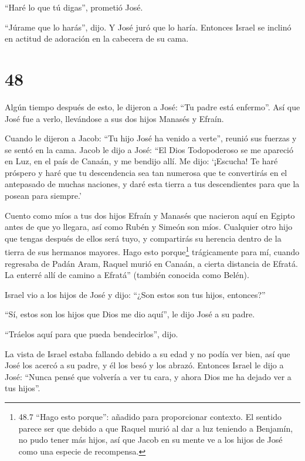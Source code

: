 ``Haré lo que tú digas'', prometió José.

 ``Júrame que lo harás'', dijo. Y José juró que lo haría.
Entonces Israel se inclinó en actitud de adoración en la cabecera de su
cama.

\hypertarget{section-47}{%
\section{48}\label{section-47}}

 Algún tiempo después de esto, le dijeron a José: ``Tu padre
está enfermo''. Así que José fue a verlo, llevándose a sus dos hijos
Manasés y Efraín.

 Cuando le dijeron a Jacob: ``Tu hijo José ha venido a
verte'', reunió sus fuerzas y se sentó en la cama.  Jacob le
dijo a José: ``El Dios Todopoderoso se me apareció en Luz, en el país de
Canaán, y me bendijo allí.  Me dijo: `¡Escucha! Te haré
próspero y haré que tu descendencia sea tan numerosa que te convertirás
en el antepasado de muchas naciones, y daré esta tierra a tus
descendientes para que la posean para siempre.'

 Cuento como míos a tus dos hijos Efraín y Manasés que
nacieron aquí en Egipto antes de que yo llegara, así como Rubén y Simeón
son míos.  Cualquier otro hijo que tengas después de ellos
será tuyo, y compartirás su herencia dentro de la tierra de sus hermanos
mayores.  Hago esto porque\footnote{48.7 ``Hago esto
  porque'': añadido para proporcionar contexto. El sentido parece ser
  que debido a que Raquel murió al dar a luz teniendo a Benjamín, no
  pudo tener más hijos, así que Jacob en su mente ve a los hijos de José
  como una especie de recompensa.} trágicamente para mí, cuando
regresaba de Padán Aram, Raquel murió en Canaán, a cierta distancia de
Efratá. La enterré allí de camino a Efratá'' (también conocida como
Belén).

 Israel vio a los hijos de José y dijo: ``¿Son estos son tus
hijos, entonces?''

 ``Sí, estos son los hijos que Dios me dio aquí'', le dijo
José a su padre.

``Tráelos aquí para que pueda bendecirlos'', dijo.

 La vista de Israel estaba fallando debido a su edad y no
podía ver bien, así que José los acercó a su padre, y él los besó y los
abrazó.  Entonces Israel le dijo a José: ``Nunca pensé que
volvería a ver tu cara, y ahora Dios me ha dejado ver a tus hijos''.

